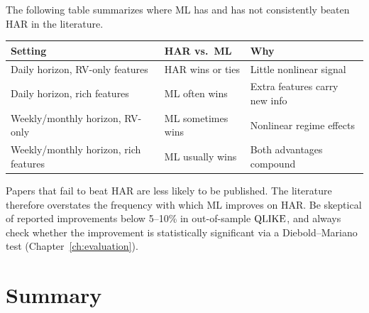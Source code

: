 The following table summarizes where ML has and has not consistently beaten HAR in the literature.

\begin{center}
\renewcommand{\arraystretch}{1.3}
\begin{tabular}{@{} l l l @{}}
\toprule
\textbf{Setting} & \textbf{HAR vs.\ ML} & \textbf{Why} \\
\midrule
Daily horizon, RV-only features & HAR wins or ties & Little nonlinear signal \\
Daily horizon, rich features & ML often wins & Extra features carry new info \\
Weekly/monthly horizon, RV-only & ML sometimes wins & Nonlinear regime effects \\
Weekly/monthly horizon, rich features & ML usually wins & Both advantages compound \\
\bottomrule
\end{tabular}
\end{center}

\begin{warning}
Papers that fail to beat HAR are less likely to be published.
The literature therefore overstates the frequency with which ML improves on HAR.
Be skeptical of reported improvements below 5--10\% in out-of-sample $\operatorname{QLIKE}$, and always check whether the improvement is statistically significant via a Diebold--Mariano test (Chapter~\ref{ch:evaluation}).
\end{warning}


\section*{Summary}

